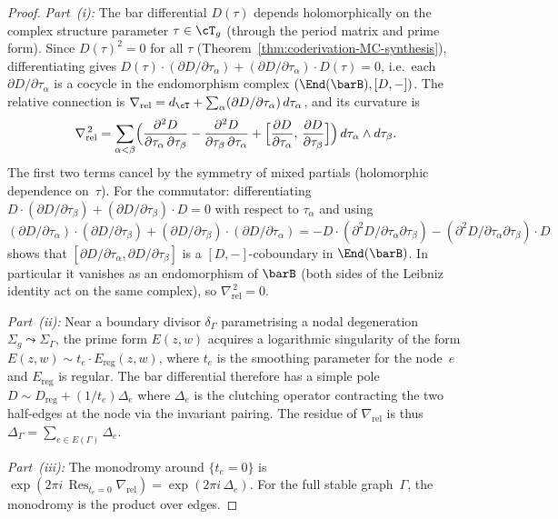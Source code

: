 \begin{proof}
\emph{Part~(i):} The bar differential $D(\tau)$ depends
holomorphically on the complex structure parameter
$\tau \in \cT_g$ (through the period matrix and prime form).
Since $D(\tau)^2 = 0$ for all $\tau$
(Theorem~\ref{thm:coderivation-MC-synthesis}), differentiating
gives $D(\tau) \cdot (\partial D/\partial\tau_\alpha)
+ (\partial D/\partial\tau_\alpha) \cdot D(\tau) = 0$,
i.e.\ each $\partial D/\partial\tau_\alpha$ is a cocycle in the
endomorphism complex $(\End(\barB), [D,-])$.
The relative connection is
$\nabla_{\mathrm{rel}} = d_{\cT} + \sum_\alpha
(\partial D/\partial\tau_\alpha)\,d\tau_\alpha$, and its curvature is
\[
\nabla_{\mathrm{rel}}^{\,2}
= \sum_{\alpha < \beta}
\Bigl(
\frac{\partial^2 D}{\partial\tau_\alpha\,\partial\tau_\beta}
- \frac{\partial^2 D}{\partial\tau_\beta\,\partial\tau_\alpha}
+ \Bigl[\frac{\partial D}{\partial\tau_\alpha},\,
 \frac{\partial D}{\partial\tau_\beta}\Bigr]
\Bigr)\,d\tau_\alpha \wedge d\tau_\beta.
\]
The first two terms cancel by the symmetry of mixed partials
(holomorphic dependence on~$\tau$). For the commutator: differentiating
$D \cdot (\partial D/\partial\tau_\beta) + (\partial D/\partial\tau_\beta) \cdot D = 0$
with respect to $\tau_\alpha$ and using
$(\partial D/\partial\tau_\alpha) \cdot (\partial D/\partial\tau_\beta)
+ (\partial D/\partial\tau_\beta) \cdot (\partial D/\partial\tau_\alpha)
= -D \cdot (\partial^2 D/\partial\tau_\alpha\partial\tau_\beta)
 - (\partial^2 D/\partial\tau_\alpha\partial\tau_\beta) \cdot D$
shows that
$[\partial D/\partial\tau_\alpha, \partial D/\partial\tau_\beta]$
is a $[D,-]$-coboundary in $\End(\barB)$. In particular
it vanishes as an endomorphism of $\barB$
(both sides of the Leibniz identity act on the same complex),
so $\nabla_{\mathrm{rel}}^{\,2} = 0$.

\emph{Part~(ii):} Near a boundary divisor $\delta_\Gamma$
parametrising a nodal degeneration $\Sigma_g \leadsto \Sigma_\Gamma$,
the prime form $E(z,w)$ acquires a logarithmic singularity of the
form $E(z,w) \sim t_e \cdot E_{\mathrm{reg}}(z,w)$, where $t_e$
is the smoothing parameter for the node~$e$ and $E_{\mathrm{reg}}$
is regular. The bar differential therefore has a simple pole
$D \sim D_{\mathrm{reg}} + (1/t_e)\Delta_e$ where $\Delta_e$ is the
clutching operator contracting the two half-edges at the node via the
invariant pairing. The residue of $\nabla_{\mathrm{rel}}$ is thus
$\Delta_\Gamma = \sum_{e \in E(\Gamma)} \Delta_e$.

\emph{Part~(iii):} The monodromy around $\{t_e = 0\}$ is
$\exp(2\pi i \, \operatorname{Res}_{t_e=0} \nabla_{\mathrm{rel}})
= \exp(2\pi i \, \Delta_e)$. For the full stable graph~$\Gamma$,
the monodromy is the product over edges.
\end{proof}

